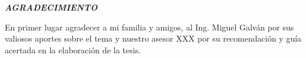 \newpage
\begin{flushright}
\textbf{\textit{ \large AGRADECIMIENTO}}\\[1cm]
\end{flushright}

\begin{flushright}
\begin{minipage}{8cm}
    \noindent
        \large
En primer lugar agradecer a mi familia y amigos, al Ing. Miguel Galván por sus valiosos aportes sobre el tema y nuestro asesor XXX por su recomendación y guía acertada en la elaboración de la tesis.




\end{minipage}
\end{flushright}